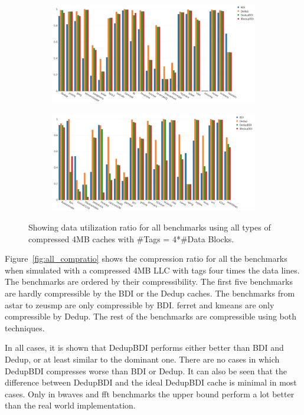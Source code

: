 \begin{figure}
    \begin{subfigure}{\textwidth}
        \includegraphics[width=\textwidth]{all-datautil1.png}
    \end{subfigure}
    \begin{subfigure}{\textwidth}
        \includegraphics[width=\textwidth]{all-datautil2.png}
    \end{subfigure}
    \caption[All benchmarks: Data Utilization]{Showing data utilization ratio for all benchmarks using all types of compressed 4MB caches with \#Tags = 4*\#Data Blocks.}
    \label{fig:all_datautil}
\end{figure}
Figure~\ref{fig:all_compratio} shows the compression ratio for all the benchmarks when simulated with a compressed 4MB LLC with tags four times the data lines. The benchmarks are ordered by their compressibility. The first five benchmarks are hardly compressible by the BDI or the Dedup caches. The benchmarks from astar to zeusmp are only compressible by BDI. ferret and kmeans are only compressible by Dedup. The rest of the benchmarks are compressible using both techniques.\par
In all cases, it is shown that DedupBDI performs either better than BDI and Dedup, or at least similar to the dominant one. There are no cases in which DedupBDI compresses worse than BDI or Dedup. It can also be seen that the difference between DedupBDI and the ideal DedupBDI cache is minimal in most cases. Only in bwaves and fft benchmarks the upper bound perform a lot better than the real world implementation.\par
